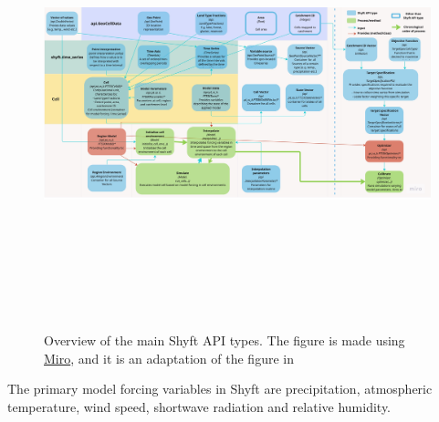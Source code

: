 \begin{figure}[ht]
    \centering
    \includegraphics[width=1.1\textwidth,height=13cm]{figures/methods/Swimlane Diagram.jpg}
    \caption{Overview of the main Shyft API types. The figure is made using \href{https://miro.com}{Miro}, and it is an adaptation of the figure in \cite{burkhart_shyft_2021}}
    \label{fig:shyft}
\end{figure}

The primary model forcing variables in Shyft are precipitation, atmospheric temperature, wind speed, shortwave radiation and relative humidity.


